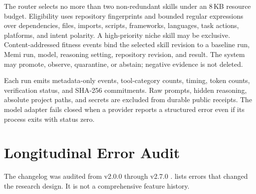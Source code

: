 \documentclass[10pt,twocolumn]{article}
\begin{document}
The router selects no more than two non-redundant skills under an 8\,KB
resource budget. Eligibility uses repository fingerprints and bounded regular
expressions over dependencies, files, imports, scripts, frameworks, languages,
task actions, platforms, and intent polarity. A high-priority niche skill may
be exclusive. Content-addressed fitness events bind the selected skill
revision to a baseline run, Memi run, model, reasoning setting, repository
revision, and result. The system may promote, observe, quarantine, or abstain;
negative evidence is not deleted.

Each run emits metadata-only events, tool-category counts, timing, token
counts, verification status, and SHA-256 commitments. Raw prompts, hidden
reasoning, absolute project paths, and secrets are excluded from durable public
receipts. The model adapter fails closed when a provider reports a structured
error even if its process exits with status zero.

\section{Longitudinal Error Audit}

The changelog was audited from v2.0.0 through v2.7.0
\cite{memi2026changelog}.  lists errors that changed the
research design. It is not a comprehensive feature history.
\end{document}
